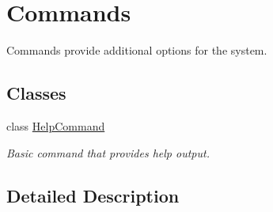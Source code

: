 \hypertarget{group__commands}{\section{Commands}
\label{group__commands}
}


Commands provide additional options for the system.  


\subsection*{Classes}
\begin{DoxyCompactItemize}
\item 
class \hyperlink{classHelpCommand}{Help\-Command}
\begin{DoxyCompactList}\small\item\em Basic command that provides help output. \end{DoxyCompactList}\end{DoxyCompactItemize}


\subsection{Detailed Description}
